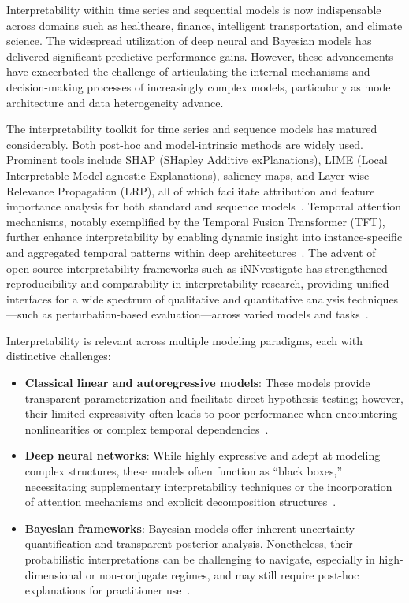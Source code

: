 \documentclass[sigconf]{acmart}
\begin{document}
Interpretability within time series and sequential models is now indispensable across domains such as healthcare, finance, intelligent transportation, and climate science. The widespread utilization of deep neural and Bayesian models has delivered significant predictive performance gains. However, these advancements have exacerbated the challenge of articulating the internal mechanisms and decision-making processes of increasingly complex models, particularly as model architecture and data heterogeneity advance.

The interpretability toolkit for time series and sequence models has matured considerably. Both post-hoc and model-intrinsic methods are widely used. Prominent tools include SHAP (SHapley Additive exPlanations), LIME (Local Interpretable Model-agnostic Explanations), saliency maps, and Layer-wise Relevance Propagation (LRP), all of which facilitate attribution and feature importance analysis for both standard and sequence models~\cite{ref3}\cite{ref11}\cite{ref30}\cite{ref31}\cite{ref55}. Temporal attention mechanisms, notably exemplified by the Temporal Fusion Transformer (TFT), further enhance interpretability by enabling dynamic insight into instance-specific and aggregated temporal patterns within deep architectures~\cite{ref3}\cite{ref30}\cite{ref31}. The advent of open-source interpretability frameworks such as iNNvestigate has strengthened reproducibility and comparability in interpretability research, providing unified interfaces for a wide spectrum of qualitative and quantitative analysis techniques—such as perturbation-based evaluation—across varied models and tasks~\cite{ref55}.

Interpretability is relevant across multiple modeling paradigms, each with distinctive challenges:

\begin{itemize}
    \item \textbf{Classical linear and autoregressive models}: These models provide transparent parameterization and facilitate direct hypothesis testing; however, their limited expressivity often leads to poor performance when encountering nonlinearities or complex temporal dependencies~\cite{ref26}\cite{ref27}\cite{ref28}\cite{ref29}.
    \item \textbf{Deep neural networks}: While highly expressive and adept at modeling complex structures, these models often function as ``black boxes,'' necessitating supplementary interpretability techniques or the incorporation of attention mechanisms and explicit decomposition structures~\cite{ref31}\cite{ref47}\cite{ref52}\cite{ref53}\cite{ref54}\cite{ref62}\cite{ref64}\cite{ref67}\cite{ref79}\cite{ref86}.
    \item \textbf{Bayesian frameworks}: Bayesian models offer inherent uncertainty quantification and transparent posterior analysis. Nonetheless, their probabilistic interpretations can be challenging to navigate, especially in high-dimensional or non-conjugate regimes, and may still require post-hoc explanations for practitioner use~\cite{ref28}\cite{ref29}\cite{ref53}\cite{ref54}\cite{ref64}\cite{ref86}.
\end{itemize}
\end{document}
